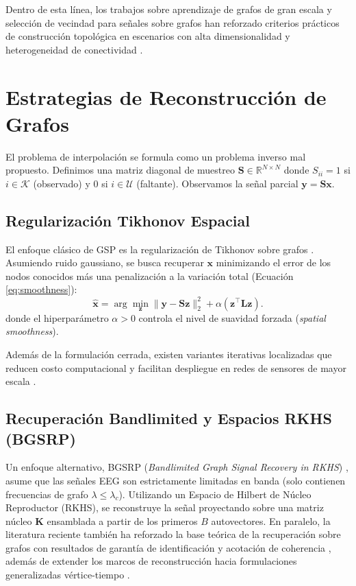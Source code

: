 Dentro de esta línea, los trabajos sobre aprendizaje de grafos de gran escala y selección de vecindad para señales sobre grafos han reforzado criterios prácticos de construcción topológica en escenarios con alta dimensionalidad y heterogeneidad de conectividad \cite{kalofolias_large_2019, shekkizhar_graph_2020, shekkizhar_neighborhood_2023}.

\section{Estrategias de Reconstrucción de Grafos}

El problema de interpolación se formula como un problema inverso mal propuesto. Definimos una matriz diagonal de muestreo $\mathbf{S} \in \mathbb{R}^{N \times N}$ donde $S_{ii} = 1$ si $i \in \mathcal{K}$ (observado) y $0$ si $i \in \mathcal{U}$ (faltante). Observamos la señal parcial $\mathbf{y} = \mathbf{S} \mathbf{x}$.

\subsection{Regularización Tikhonov Espacial}
El enfoque clásico de GSP es la regularización de Tikhonov sobre grafos \cite{narang_signal_2013}. Asumiendo ruido gaussiano, se busca recuperar $\mathbf{x}$ minimizando el error de los nodos conocidos más una penalización a la variación total (Ecuación \ref{eq:smoothness}):
\begin{equation}
    \hat{\mathbf{x}} = \arg\min_{\mathbf{z}} \| \mathbf{y} - \mathbf{S} \mathbf{z} \|_2^2 + \alpha (\mathbf{z}^\top \mathbf{L} \mathbf{z}).
    \label{eq:tikhonov_general}
\end{equation}
donde el hiperparámetro $\alpha > 0$ controla el nivel de suavidad forzada (\textit{spatial smoothness}). 

Además de la formulación cerrada, existen variantes iterativas localizadas que reducen costo computacional y facilitan despliegue en redes de sensores de mayor escala \cite{narang_localized_2013}.

\subsection{Recuperación Bandlimited y Espacios RKHS (BGSRP)}
Un enfoque alternativo, BGSRP (\textit{Bandlimited Graph Signal Recovery in RKHS}) \cite{zhang_recovery_2024}, asume que las señales EEG son estrictamente limitadas en banda (solo contienen frecuencias de grafo $\lambda \le \lambda_c$). Utilizando un Espacio de Hilbert de Núcleo Reproductor (RKHS), se reconstruye la señal proyectando sobre una matriz núcleo $\mathbf{K}$ ensamblada a partir de los primeros $B$ autovectores. En paralelo, la literatura reciente también ha reforzado la base teórica de la recuperación sobre grafos con resultados de garantía de identificación y acotación de coherencia \cite{morgenstern_theoretical_2025}, además de extender los marcos de reconstrucción hacia formulaciones generalizadas vértice-tiempo \cite{zhao_generalized_2025}.

